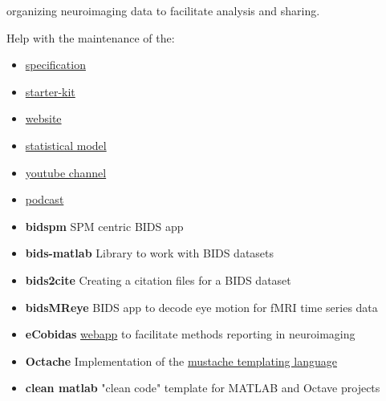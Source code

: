 
 organizing neuroimaging data to facilitate analysis and sharing.

Help with the maintenance of the:
\begin{itemize}
    \item \href{https://bids-specification.readthedocs.io/en/latest/}{specification}
    \item \href{https://bids-standard.github.io/bids-starter-kit/}{starter-kit}
    \item \href{https://bids.neuroimaging.io/}{website}
    \item \href{https://bids-standard.github.io/stats-models/}{statistical model}
    \item \href{https://www.youtube.com/channel/UCxZUcYfd_nvIVWAbzRB1tlw}{youtube channel}
    \item \href{https://anchor.fm/bids-maintenance}{podcast}
\end{itemize}

\vspace{5mm}



\begin{itemize}
    \item \textbf{bidspm} \matlabicon \octaveicon SPM centric BIDS app 
    \item \textbf{bids-matlab} \matlabicon \octaveicon Library to work with BIDS datasets 
    \item \textbf{bids2cite} \pythonicon Creating a citation files for a BIDS dataset 
    \item \textbf{bidsMReye} \pythonicon BIDS app to decode eye motion for fMRI time series data 
    \item \textbf{eCobidas} \pythonicon \vueicon \href{https://ohbm.github.io/cobidas/}{webapp} 
    to facilitate methods reporting in neuroimaging 
    \item \textbf{Octache} \matlabicon \octaveicon 
    Implementation of the \href{https://mustache.github.io/}{mustache templating language}  
    \item \textbf{clean matlab} \matlabicon \octaveicon "clean code" template for MATLAB and Octave projects 
\end{itemize}




